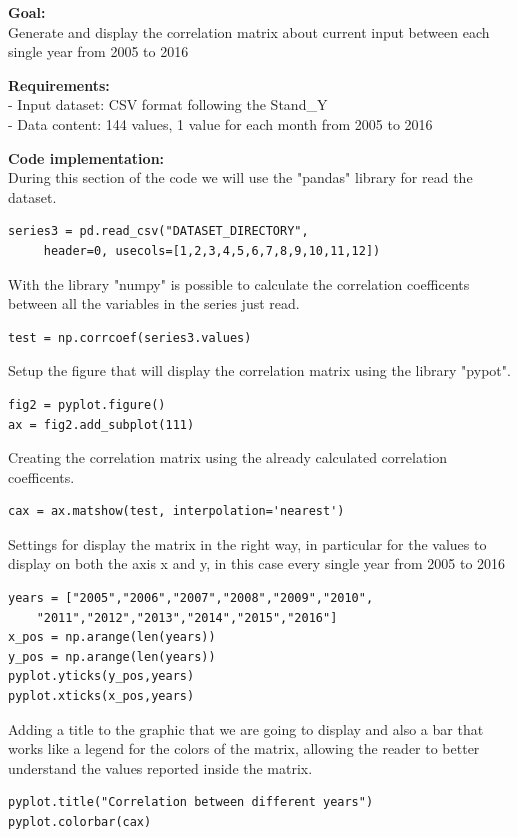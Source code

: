 \textbf{Goal:}\\
Generate and display the correlation matrix about current input between each single year from 2005 to 2016

\textbf{Requirements:}\\
- Input dataset: CSV format following the Stand\_Y \\
- Data content: 144 values, 1 value for each month from 2005 to 2016

\textbf{Code implementation:}\\
During this section of the code we will use the "pandas" library for read the dataset.
\begin{lstlisting}
series3 = pd.read_csv("DATASET_DIRECTORY",
	 header=0, usecols=[1,2,3,4,5,6,7,8,9,10,11,12])
\end{lstlisting}

With the library "numpy" is possible to calculate the correlation coefficents between all the variables in the series just read.
\begin{lstlisting}
test = np.corrcoef(series3.values)
\end{lstlisting}

Setup the figure that will display the correlation matrix using the library "pypot".
\begin{lstlisting}
fig2 = pyplot.figure()
ax = fig2.add_subplot(111)
\end{lstlisting}

Creating the correlation matrix using the already calculated correlation coefficents.
\begin{lstlisting}
cax = ax.matshow(test, interpolation='nearest')
\end{lstlisting}

Settings for display the matrix in the right way, in particular for the values to display on both the axis x and y, in this case every single year from 2005 to 2016
\begin{lstlisting}
years = ["2005","2006","2007","2008","2009","2010",
	"2011","2012","2013","2014","2015","2016"]
x_pos = np.arange(len(years))
y_pos = np.arange(len(years))
pyplot.yticks(y_pos,years)
pyplot.xticks(x_pos,years)
\end{lstlisting}
\newpage
Adding a title to the graphic that we are going to display and also a bar that works like a legend for the colors of the matrix, allowing the reader to better understand the values reported inside the matrix.
\begin{lstlisting}
pyplot.title("Correlation between different years")
pyplot.colorbar(cax)
\end{lstlisting}

